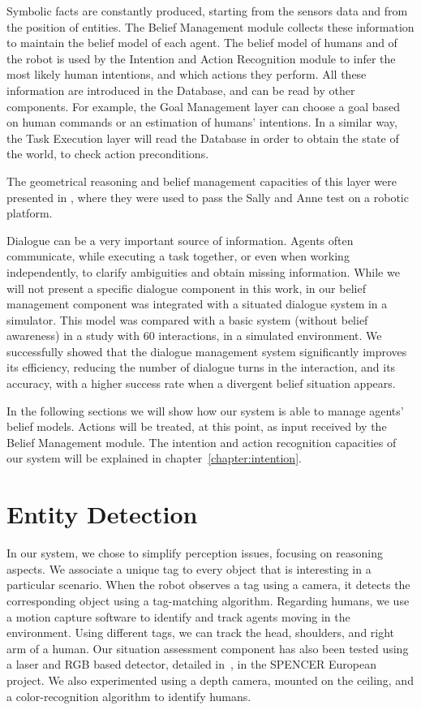 Symbolic facts are constantly produced, starting from the sensors data and from the position of entities. The Belief Management module collects these information to maintain the belief model of each agent. The belief model of humans and of the robot is used by the Intention and Action Recognition module to infer the most likely human intentions, and which actions they perform. All these information are introduced in the Database, and can be read by other components. For example, the Goal Management layer can choose a goal based on human commands or an estimation of humans' intentions. In a similar way, the Task Execution layer will read the Database in order to obtain the state of the world, to check action preconditions.  

The geometrical reasoning and belief management capacities of this layer were presented in \cite{Milliez2014}, where they were used to pass the Sally and Anne test on a robotic platform. 

Dialogue can be a very important source of information. Agents often communicate, while executing a task together, or even when working independently, to clarify ambiguities and obtain missing information. While we will not present a specific dialogue component in this work,  in \cite{Ferreira2015} our belief management component was integrated with a situated dialogue system in a simulator. This model was compared with a basic system (without belief awareness) in a study with 60 interactions, in a simulated environment. We successfully showed that the dialogue management system significantly improves its efficiency, reducing the number of dialogue turns in the interaction, and its accuracy, with a higher success rate when a divergent belief situation appears.

In the following sections we will show how our system is able to manage agents' belief models. Actions will be treated, at this point, as input received by the Belief Management module. The intention and action recognition capacities of our system will be explained in chapter~\ref{chapter:intention}. 

\section{Entity Detection}
\label{sec:belief_management-entity_detection}
In our system, we chose to simplify perception issues, focusing on reasoning aspects. We associate a unique tag to every object that is interesting in a particular scenario. When the robot observes a tag using a camera, it detects the corresponding object using a tag-matching algorithm.
Regarding humans, we use a motion capture software to identify and track agents moving in the environment. Using different tags, we can track the head, shoulders, and right arm of a human. Our situation assessment component has also been tested using a laser and RGB based detector, detailed in~\cite{lindermulti}, in the SPENCER European project. We also experimented using a depth camera, mounted on the ceiling, and a color-recognition algorithm to identify humans. 


